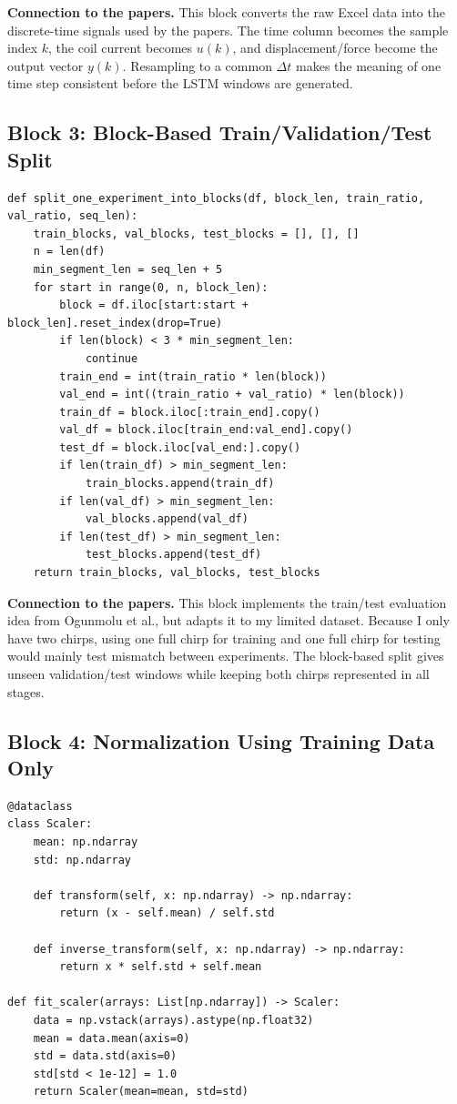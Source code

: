 \documentclass[11pt]{article}
\begin{document}
\noindent\textbf{Connection to the papers.}
This block converts the raw Excel data into the discrete-time signals used by the papers. The time column becomes the sample index $k$, the coil current becomes $u(k)$, and displacement/force become the output vector $y(k)$. Resampling to a common $\Delta t$ makes the meaning of one time step consistent before the LSTM windows are generated.

\subsection{Block 3: Block-Based Train/Validation/Test Split}
\begin{lstlisting}[style=pythonstyle]
def split_one_experiment_into_blocks(df, block_len, train_ratio, val_ratio, seq_len):
    train_blocks, val_blocks, test_blocks = [], [], []
    n = len(df)
    min_segment_len = seq_len + 5
    for start in range(0, n, block_len):
        block = df.iloc[start:start + block_len].reset_index(drop=True)
        if len(block) < 3 * min_segment_len:
            continue
        train_end = int(train_ratio * len(block))
        val_end = int((train_ratio + val_ratio) * len(block))
        train_df = block.iloc[:train_end].copy()
        val_df = block.iloc[train_end:val_end].copy()
        test_df = block.iloc[val_end:].copy()
        if len(train_df) > min_segment_len:
            train_blocks.append(train_df)
        if len(val_df) > min_segment_len:
            val_blocks.append(val_df)
        if len(test_df) > min_segment_len:
            test_blocks.append(test_df)
    return train_blocks, val_blocks, test_blocks
\end{lstlisting}

\noindent\textbf{Connection to the papers.}
This block implements the train/test evaluation idea from Ogunmolu et al., but adapts it to my limited dataset. Because I only have two chirps, using one full chirp for training and one full chirp for testing would mainly test mismatch between experiments. The block-based split gives unseen validation/test windows while keeping both chirps represented in all stages.

\subsection{Block 4: Normalization Using Training Data Only}
\begin{lstlisting}[style=pythonstyle]
@dataclass
class Scaler:
    mean: np.ndarray
    std: np.ndarray

    def transform(self, x: np.ndarray) -> np.ndarray:
        return (x - self.mean) / self.std

    def inverse_transform(self, x: np.ndarray) -> np.ndarray:
        return x * self.std + self.mean

def fit_scaler(arrays: List[np.ndarray]) -> Scaler:
    data = np.vstack(arrays).astype(np.float32)
    mean = data.mean(axis=0)
    std = data.std(axis=0)
    std[std < 1e-12] = 1.0
    return Scaler(mean=mean, std=std)
\end{lstlisting}
\end{document}
